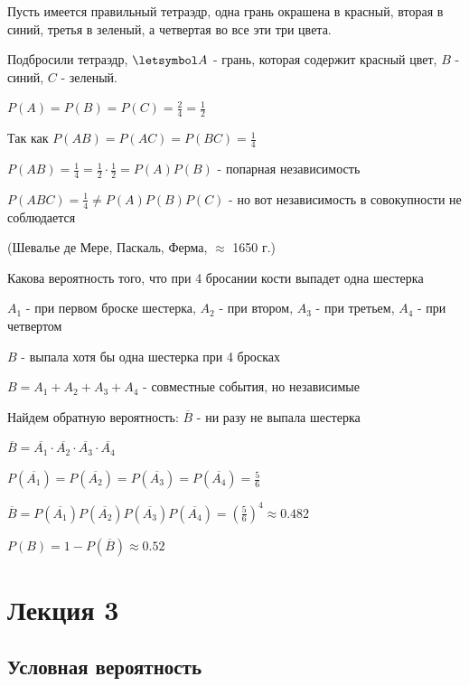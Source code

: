 \documentclass[12pt]{article}
\begin{document}
    Пусть имеется правильный тетраэдр, одна грань окрашена в красный, вторая в синий, третья в зеленый, а четвертая во все эти три цвета.

    Подбросили тетраэдр, $\letsymbol A$ - грань, которая содержит красный цвет, $B$ - синий, $C$ - зеленый.

    $P(A) = P(B) = P(C) = \frac{2}{4} = \frac{1}{2}$

    Так как $P(AB) = P(AC) = P(BC) = \frac{1}{4}$

    $P(AB) = \frac{1}{4} = \frac{1}{2} \cdot \frac{1}{2} = P(A) P(B)$ - попарная независимость

    $P(ABC) = \frac{1}{4} \neq P(A) P(B) P(C)$ - но вот независимость в совокупности не соблюдается

    \Ex (Шевалье де Мере, Паскаль, Ферма, $\approx$ 1650 г.)

    Какова вероятность того, что при 4 бросании кости выпадет одна шестерка

    $A_1$ - при первом броске шестерка, $A_2$ - при втором, $A_3$ - при третьем, $A_4$ - при четвертом

    $B$ - выпала хотя бы одна шестерка при 4 бросках

    $B = A_1 + A_2 + A_3 + A_4$ - совместные события, но независимые

    Найдем обратную вероятность: $\overline{B}$ - ни разу не выпала шестерка

    $\overline{B} = \overline{A_1} \cdot \overline{A_2} \cdot \overline{A_3} \cdot \overline{A_4}$

    $P(\overline{A_1}) = P(\overline{A_2}) = P(\overline{A_3}) = P(\overline{A_4}) = \frac{5}{6}$

    $\overline{B} = P(\overline{A_1}) P(\overline{A_2}) P(\overline{A_3}) P(\overline{A_4}) = \left(\frac{5}{6}\right)^4 \approx 0.482$

    $P(B) = 1 - P(\overline{B}) \approx 0.52$


    \section{Лекция 3}

    \hypertarget{conditionalprobability}{}

    \subsection{Условная вероятность}
\end{document}
